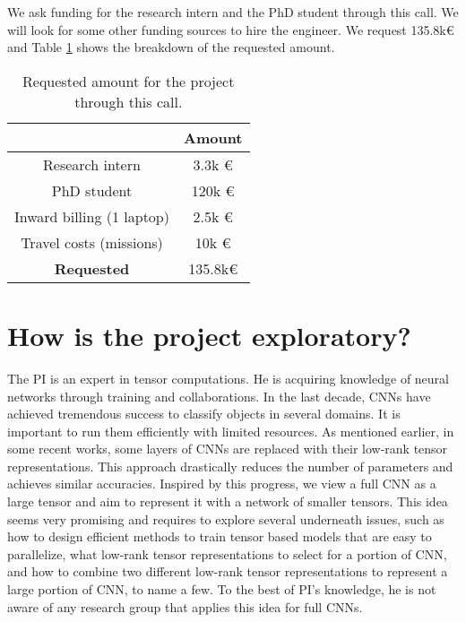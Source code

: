 \documentclass[11pt]{article}
\begin{document}
We ask funding for the research intern and the PhD student through this call. We will look for some other funding sources to hire the engineer.  We request 135.8k\euro\xspace and Table \ref{tab:reqcost} shows the breakdown of the requested amount.

\begin{table}
	\begin{center}
\begin{tabular}{|c|c|}
\hline
& Amount\\ \hline
Research intern & 3.3k \euro \\ \hline
PhD student & 120k \euro \\ \hline
Inward billing (1 laptop) & 2.5k \euro \\ \hline
Travel costs (missions) & 10k \euro \\ \hline
\textbf{Requested} & 135.8k\euro\\ \hline
\end{tabular}
	\caption{Requested amount for the project through this call.\label{tab:reqcost}}
\end{center}
\end{table}











\section{How is the project exploratory?}

The PI is an expert in tensor computations. He is acquiring knowledge of neural networks through training and collaborations. In the last decade,  CNNs have achieved tremendous success to classify objects in several domains. It is important to run them efficiently with limited resources. As mentioned earlier, in some recent works, some layers of CNNs are replaced with their low-rank tensor representations. This approach drastically reduces the number of parameters and achieves similar accuracies. Inspired by this progress, we view a full CNN as a large tensor and aim to represent it with a network of smaller tensors. This idea seems very promising and requires to explore several underneath issues, such as how to design efficient methods to train tensor based models that are easy to parallelize, what low-rank tensor representations to select for a portion of CNN, and how to combine  two different low-rank tensor representations  to represent a large portion of CNN, to name a few. To the best of PI's knowledge, he is not aware of any research group that applies this idea for full CNNs.  
\end{document}
